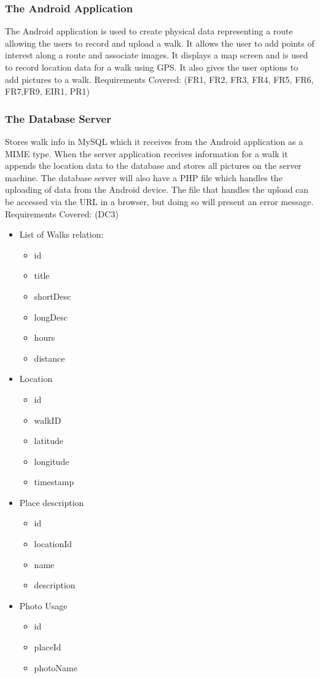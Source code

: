 \documentclass[12pt]{article}
\begin{document}
\subsubsection{The Android Application}
\par{The Android application is used to create physical data representing a route allowing the users to record and upload a walk. It allows the user to add points of interest along a route and associate images. It displays a map screen and is used to record location data for a walk using GPS. It also gives the user options to add pictures to a walk. \newline Requirements Covered: (FR1, FR2, FR3, FR4, FR5, FR6, FR7,FR9, EIR1, PR1)}
\subsubsection{The Database Server}
Stores walk info in MySQL which it receives from the Android application as a MIME type. When the server application receives information for a walk it appends the location data to the database and stores all pictures on the server machine. The database server will also have a PHP file which handles the uploading of data from the Android device. The file that handles the upload can be accessed via the URL in a browser, but doing so will present an error message.
Requirements Covered: (DC3)
\begin{itemize}
	\item List of Walks relation:
	\begin{itemize}
		\item id
		\item title
		\item shortDesc
		\item longDesc
		\item hours
		\item distance
	\end {itemize}
	\item Location
	\begin{itemize}
		\item id
		\item walkID
		\item latitude
		\item longitude
		\item timestamp
	\end{itemize}
	\item Place description
	\begin{itemize}
		\item id
		\item locationId
		\item name
		\item description
	\end{itemize}
	\item Photo Usage
	\begin{itemize}
		\item id
		\item placeId
		\item photoName
	\end{itemize}
\end{itemize}
\end{document}
